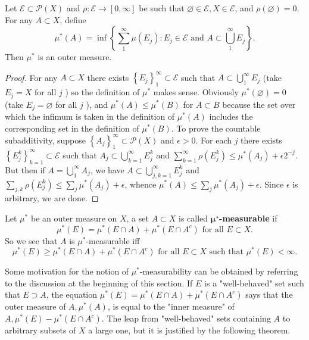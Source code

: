 \documentclass[12pt, a4paper, oneside]{book}
\begin{document}
\begin{proposition}
    \label{pro: Outer measure}
    Let $\mathcal{E} \subset \mathcal{P}(X)$ and $\rho: \mathcal{E} \rightarrow[0, \infty]$ be such that $\varnothing \in \mathcal{E}, X \in \mathcal{E}$, and $\rho(\varnothing)=0$. For any $A \subset X$, define
    \begin{equation*}
        \mu^*(A)=\inf \left\{\sum_1^{\infty} \mu\left(E_j\right): E_j \in \mathcal{E} \text { and } A \subset \bigcup_1^{\infty} E_j\right\} .
    \end{equation*}
    Then $\mu^*$ is an outer measure.
    \begin{proof}
        For any $A \subset X$ there exists $\left\{E_j\right\}_1^{\infty} \subset \mathcal{E}$ such that $A \subset \bigcup_1^{\infty} E_j$ (take $E_j=X$ for all $j$ ) so the definition of $\mu^*$ makes sense. Obviously $\mu^*(\varnothing)=0$ (take $E_j=\varnothing$ for all $j$ ), and $\mu^*(A) \leq \mu^*(B)$ for $A \subset B$ because the set over which the infimum is taken in the definition of $\mu^*(A)$ includes the corresponding set in the definition of $\mu^*(B)$. To prove the countable subadditivity, suppose $\left\{A_j\right\}_1^{\infty} \subset \mathcal{P}(X)$ and $\epsilon>0$. For each $j$ there exists $\left\{E_j^k\right\}_{k=1}^{\infty} \subset \mathcal{E}$ such that $A_j \subset \bigcup_{k=1}^{\infty} E_j^k$ and $\sum_{k=1}^{\infty} \rho\left(E_j^k\right) \leq \mu^*\left(A_j\right)+\epsilon 2^{-j}$. But then if $A=\bigcup_1^{\infty} A_j$, we have $A \subset \bigcup_{j, k=1}^{\infty} E_j^k$ and $\sum_{j, k} \rho\left(E_j^k\right) \leq \sum_j \mu^*\left(A_j\right)+\epsilon$, whence $\mu^*(A) \leq \sum_j \mu^*\left(A_j\right)+\epsilon$. Since $\epsilon$ is arbitrary, we are done.
    \end{proof}
\end{proposition}


\begin{definition}
    Let $\mu^*$ be an outer measure on $X$, a set $A \subset X$ is called \textbf{$\boldsymbol{\mu}^{\star}$-measurable} if
    \begin{equation*}
        \mu^*(E)=\mu^*(E \cap A)+\mu^*\left(E \cap A^c\right) \text { for all } E \subset X .
    \end{equation*}
    So we see that $A$ is $\mu^*$-measurable iff
    \begin{equation*}
        \mu^*(E) \geq \mu^*(E \cap A)+\mu^*\left(E \cap A^c\right) \text { for all } E \subset X \text { such that } \mu^*(E)<\infty .
    \end{equation*}

    Some motivation for the notion of $\mu^*$-measurability can be obtained by referring to the discussion at the beginning of this section. If $E$ is a "well-behaved" set such that $E \supset A$, the equation $\mu^*(E)=\mu^*(E \cap A)+\mu^*\left(E \cap A^c\right)$ says that the outer measure of $A, \mu^*(A)$, is equal to the "inner measure" of $A, \mu^*(E)-\mu^*\left(E \cap A^c\right)$. The leap from "well-behaved" sets containing $A$ to arbitrary subsets of $X$ a large one, but it is justified by the following theorem.
\end{definition}
\end{document}
